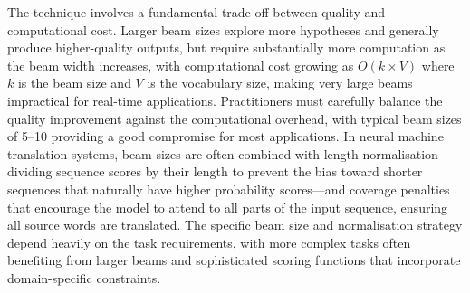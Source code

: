 The technique involves a fundamental trade-off between quality and computational cost. Larger beam sizes explore more hypotheses and generally produce higher-quality outputs, but require substantially more computation as the beam width increases, with computational cost growing as $O(k \times V)$ where $k$ is the beam size and $V$ is the vocabulary size, making very large beams impractical for real-time applications. Practitioners must carefully balance the quality improvement against the computational overhead, with typical beam sizes of 5–10 providing a good compromise for most applications. In neural machine translation systems, beam sizes are often combined with length normalisation—dividing sequence scores by their length to prevent the bias toward shorter sequences that naturally have higher probability scores—and coverage penalties that encourage the model to attend to all parts of the input sequence, ensuring all source words are translated. The specific beam size and normalisation strategy depend heavily on the task requirements, with more complex tasks often benefiting from larger beams and sophisticated scoring functions that incorporate domain-specific constraints.
